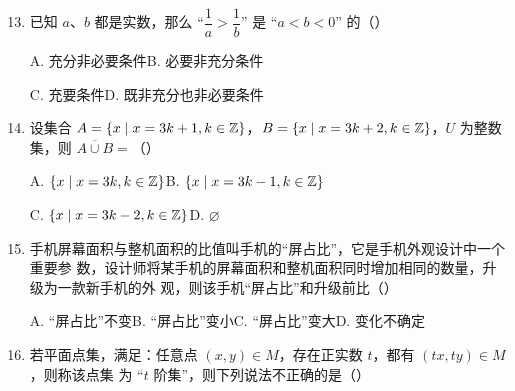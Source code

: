 \documentclass[a4paper,11pt]{article}
\begin{document}
\begin{enumerate}
\setcounter{enumi}{12}

\item 已知 $a$、$b$ 都是实数，那么 “$\dfrac1a>\dfrac1b$” 是 “$a<b<0$” 的\mbox{（\quad）}

\keepwithprev
A. 充分非必要条件\qquad\qquad B. 必要非充分条件

C. 充要条件\qquad\qquad D. 既非充分也非必要条件

\ifanswer
\solbegin
{}
\solend

\fi

\item 设集合 $A=\{x\mid x=3k+1,k\in\mathbb{Z}\}$，$B=\{x\mid x=3k+2,k\in\mathbb{Z}\}$，$U$ 为整数集，则
$\overline{A\cup B}=$\mbox{（\quad）}

\keepwithprev
A. $\{x\mid x=3k,k\in\mathbb{Z}\}$\qquad\qquad B. $\{x\mid x=3k-1,k\in\mathbb{Z}\}$

C. $\{x\mid x=3k-2,k\in\mathbb{Z}\}$\qquad\qquad D. $\varnothing$

\ifanswer
\solbegin
{}
\solend

\fi

\item 手机屏幕面积与整机面积的比值叫手机的“屏占比”，它是手机外观设计中一个重要参
数，设计师将某手机的屏幕面积和整机面积同时增加相同的数量，升级为一款新手机的外
观，则该手机“屏占比”和升级前比\mbox{（\quad）}

\keepwithprev
A. “屏占比”不变\qquad B. “屏占比”变小\qquad C. “屏占比”变大\qquad D. 变化不确定

\ifanswer
\solbegin
{}
\solend

\fi

\item 若平面点集，满足：任意点 $(x,y)\in M$，存在正实数 $t$，都有 $(tx,ty)\in M$，则称该点集
为 “$t$ 阶集”，则下列说法不正确的是\mbox{（\quad）}%


\end{enumerate}
\end{document}
